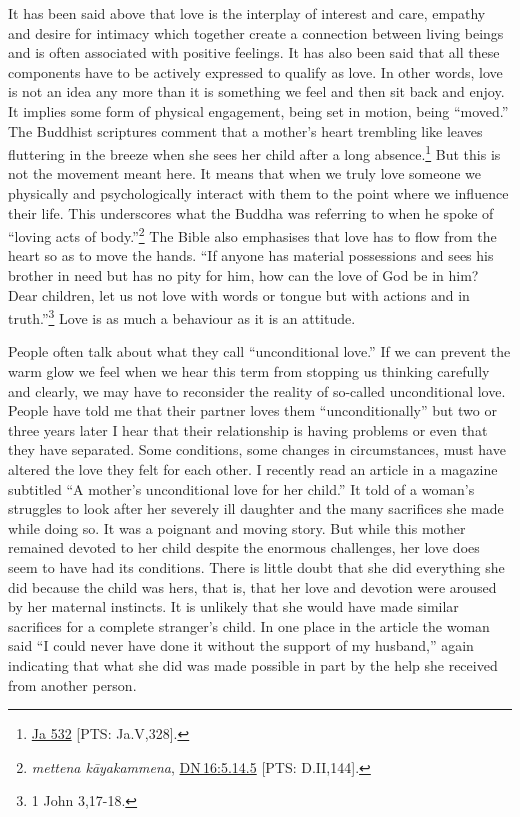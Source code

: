 \documentclass[10pt, openright]{book}
\begin{document}
It has been said above that love is the interplay of interest and care, empathy and desire for intimacy which together create a connection between living beings and is often associated with positive feelings. It has also been said that all these components have to be actively expressed to qualify as love. In other words, love is not an idea any more than it is something we feel and then sit back and enjoy. It implies some form of physical engagement, being set in motion, being “moved.” The Buddhist scriptures comment that a mother’s heart trembling like leaves fluttering in the breeze when she sees her child after a long absence.\footnote {\href{https://suttacentral.net/ja532/en/francis?reference=main/pts#pts-vp-pli328}{Ja 532} [PTS: Ja.V,328].} But this is not the movement meant here. It means that when we truly love someone we physically and psychologically interact with them to the point where we influence their life. This underscores what the Buddha was referring to when he spoke of “loving acts of body.”\footnote {\textit{mettena kāyakammena}, \href{https://suttacentral.net/dn16/en/sujato\#5.14.5}{DN 16:5.14.5} [PTS: D.II,144].} The Bible also emphasises that love has to flow from the heart so as to move the hands. “If anyone has material possessions and sees his brother in need but has no pity for him, how can the love of God be in him? Dear children, let us not love with words or tongue but with actions and in truth.”\footnote {1 John 3,17-18.} Love is as much a behaviour as it is an attitude.


People often talk about what they call “unconditional love.” If we can prevent the warm glow we feel when we hear this term from stopping us thinking carefully and clearly, we may have to reconsider the reality of so-called unconditional love. People have told me that their partner loves them “unconditionally” but two or three years later I hear that their relationship is having problems or even that they have separated. Some conditions, some changes in circumstances, must have altered the love they felt for each other. I recently read an article in a magazine subtitled “A mother’s unconditional love for her child.” It told of a woman’s struggles to look after her severely ill daughter and the many sacrifices she made while doing so. It was a poignant and moving story. But while this mother remained devoted to her child despite the enormous challenges, her love does seem to have had its conditions. There is little doubt that she did everything she did because the child was hers, that is, that her love and devotion were aroused by her maternal instincts. It is unlikely that she would have made similar sacrifices for a complete stranger’s child. In one place in the article the woman said “I could never have done it without the support of my husband,” again indicating that what she did was made possible in part by the help she received from another person.
\end{document}
